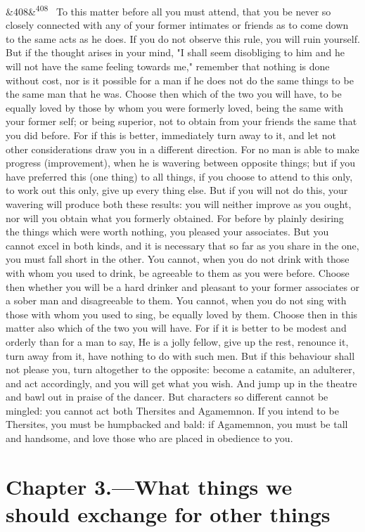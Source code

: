 \documentclass[12pt]{article}
\newcommand{\para}[1][]{\par\noindent\ifx&#1&\else\textsuperscript{\footnotesize #1}~\fi}
\begin{document}
\para[408] To this matter before all you must attend, that you be never so closely connected with any of your former intimates or friends as to come down to the same acts as he does. If you do not observe this rule, you will ruin yourself. But if the thought arises in your mind, "I shall seem disobliging to him and he will not have the same feeling towards me," remember that nothing is done without cost, nor is it possible for a man if he does not do the same things to be the same man that he was. Choose then which of the two you will have, to be equally loved by those by whom you were formerly loved, being the same with your former self; or being superior, not to obtain from your friends the same that you did before. For if this is better, immediately turn away to it, and let not other considerations draw you in a different direction. For no man is able to make progress (improvement), when he is wavering between opposite things; but if you have preferred this (one thing) to all things, if you choose to attend to this only, to work out this only, give up every thing else. But if you will not do this, your wavering will produce both these results: you will neither improve as you ought, nor will you obtain what you formerly obtained. For before by plainly desiring the things which were worth nothing, you pleased your associates. But you cannot excel in both kinds, and it is necessary that so far as you share in the one, you must fall short in the other. You cannot, when you do not drink with those with whom you used to drink, be agreeable to them as you were before. Choose then whether you will be a hard drinker and pleasant to your former associates or a sober man and disagreeable to them. You cannot, when you do not sing with those with whom you used to sing, be equally loved by them. Choose then in this matter also which of the two you will have. For if it is better to be modest and orderly than for a man to say, He is a jolly fellow, give up the rest, renounce it, turn away from it, have nothing to do with such men. But if this behaviour shall not please you, turn altogether to the opposite: become a catamite, an adulterer, and act accordingly, and you will get what you wish. And jump up in the theatre and bawl out in praise of the dancer. But characters so different cannot be mingled: you cannot act both Thersites and Agamemnon. If you intend to be Thersites, you must be humpbacked and bald: if Agamemnon, you must be tall and handsome, and love those who are placed in obedience to you.

\section*{Chapter 3.---What things we should exchange for other things}
\end{document}

